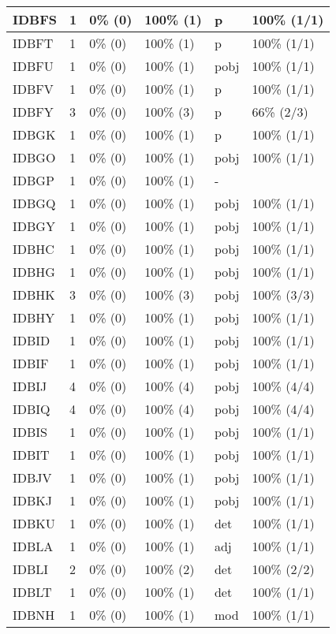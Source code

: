 \begin{figure*}
\begin{tabular}{|l|l|l|l||l|l|}
\hline
 IDBFS & 1 & 0\% (0) & 100\% (1) & p & 100\% (1/1) \\ 
\hline
 IDBFT & 1 & 0\% (0) & 100\% (1) & p & 100\% (1/1) \\ 
\hline
 IDBFU & 1 & 0\% (0) & 100\% (1) & pobj & 100\% (1/1) \\ 
\hline
 IDBFV & 1 & 0\% (0) & 100\% (1) & p & 100\% (1/1) \\ 
\hline
 IDBFY & 3 & 0\% (0) & 100\% (3) & p & 66\% (2/3) \\ 
\hline
 IDBGK & 1 & 0\% (0) & 100\% (1) & p & 100\% (1/1) \\ 
\hline
 IDBGO & 1 & 0\% (0) & 100\% (1) & pobj & 100\% (1/1) \\ 
\hline
 IDBGP & 1 & 0\% (0) & 100\% (1) & - &  \\ 
\hline
 IDBGQ & 1 & 0\% (0) & 100\% (1) & pobj & 100\% (1/1) \\ 
\hline
 IDBGY & 1 & 0\% (0) & 100\% (1) & pobj & 100\% (1/1) \\ 
\hline
 IDBHC & 1 & 0\% (0) & 100\% (1) & pobj & 100\% (1/1) \\ 
\hline
 IDBHG & 1 & 0\% (0) & 100\% (1) & pobj & 100\% (1/1) \\ 
\hline
 IDBHK & 3 & 0\% (0) & 100\% (3) & pobj & 100\% (3/3) \\ 
\hline
 IDBHY & 1 & 0\% (0) & 100\% (1) & pobj & 100\% (1/1) \\ 
\hline
 IDBID & 1 & 0\% (0) & 100\% (1) & pobj & 100\% (1/1) \\ 
\hline
 IDBIF & 1 & 0\% (0) & 100\% (1) & pobj & 100\% (1/1) \\ 
\hline
 IDBIJ & 4 & 0\% (0) & 100\% (4) & pobj & 100\% (4/4) \\ 
\hline
 IDBIQ & 4 & 0\% (0) & 100\% (4) & pobj & 100\% (4/4) \\ 
\hline
 IDBIS & 1 & 0\% (0) & 100\% (1) & pobj & 100\% (1/1) \\ 
\hline
 IDBIT & 1 & 0\% (0) & 100\% (1) & pobj & 100\% (1/1) \\ 
\hline
 IDBJV & 1 & 0\% (0) & 100\% (1) & pobj & 100\% (1/1) \\ 
\hline
 IDBKJ & 1 & 0\% (0) & 100\% (1) & pobj & 100\% (1/1) \\ 
\hline
 IDBKU & 1 & 0\% (0) & 100\% (1) & det & 100\% (1/1) \\ 
\hline
 IDBLA & 1 & 0\% (0) & 100\% (1) & adj & 100\% (1/1) \\ 
\hline
 IDBLI & 2 & 0\% (0) & 100\% (2) & det & 100\% (2/2) \\ 
\hline
 IDBLT & 1 & 0\% (0) & 100\% (1) & det & 100\% (1/1) \\ 
\hline
 IDBNH & 1 & 0\% (0) & 100\% (1) & mod & 100\% (1/1) \\ 
\hline
\end{tabular}
\end{figure*}
